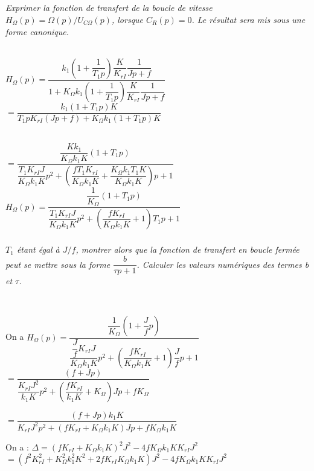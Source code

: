 \begin{multicols}{2}
 
 
 
 \fi
 

\subparagraph{}\textit{Exprimer la fonction de transfert de la boucle de vitesse
  \(H_{\Omega}\left( p \right) = \Omega(p)/U_{C\Omega}(p)\), lorsque
  \(C_{R}\left( p \right) = 0\). Le résultat sera mis sous une forme canonique.}

\ifprof
\begin{corrige}~\\

$H_{\Omega}(p)=\dfrac{k_{1}\left( 1 + \dfrac{1}{T_{1}p} \right)\dfrac{K}{K_{rI}}\dfrac{1}{Jp+f}}{1+ K_{\Omega}k_{1}\left( 1 +\dfrac{1}{T_{1}p} \right)\dfrac{K}{K_{rI}}\dfrac{1}{Jp+f}}$
$=\dfrac{k_{1}\left( 1 + T_{1}p \right)K}{T_{1}p K_{rI}\left(Jp+f\right) + K_{\Omega}k_{1}\left(1+ T_{1}p\right) K}$

~\\

$=\dfrac{\dfrac{Kk_{1}}{K_{\Omega}k_{1}K}\left( 1 + T_{1}p \right)}{\dfrac{T_{1} K_{rI}J}{K_{\Omega}k_{1}K}p^2+\left(\dfrac{fT_{1} K_{rI}}{K_{\Omega}k_{1}K}+\dfrac{K_{\Omega}k_{1}T_{1}K}{K_{\Omega}k_{1}K}\right)p + 1 }$
$H_{\Omega}(p)=\dfrac{\dfrac{1}{K_{\Omega}}\left( 1 + T_{1}p \right)}{\dfrac{T_{1} K_{rI}J}{K_{\Omega}k_{1}K}p^2+\left(\dfrac{f K_{rI}}{K_{\Omega}k_{1}K}+1\right)T_{1}p + 1 }$

\end{corrige}
\else
\fi

\subparagraph{}\textit{$T_1$ étant égal à $J/f$, montrer alors que
  la fonction de transfert en boucle fermée peut se mettre sous la forme
  \(\dfrac{b}{\tau p + 1}\). Calculer les valeurs numériques des termes
  \emph{b} et \emph{$\tau$}.}

\ifprof
\begin{corrige}~\\

\footnotesize

On a 
$H_{\Omega}(p)=\dfrac{\dfrac{1}{K_{\Omega}}\left( 1 + \dfrac{J}{f}p \right)}{\dfrac{\dfrac{J}{f} K_{rI}J}{K_{\Omega}k_{1}K}p^2+\left(\dfrac{f K_{rI}}{K_{\Omega}k_{1}K}+1\right)\dfrac{J}{f}p + 1 }$
$=\dfrac{\left( f + Jp \right)}{\dfrac{ K_{rI}J^2}{k_{1}K}p^2+\left(\dfrac{f K_{rI}}{k_{1}K}+K_{\Omega}\right)Jp + fK_{\Omega}}$

$=\dfrac{\left( f + Jp \right)k_{1}K}{ K_{rI}J^2p^2+\left(f K_{rI}+K_{\Omega}k_{1}K\right)Jp + fK_{\Omega}k_{1}K}$


On a :
$\Delta =\left(f K_{rI}+K_{\Omega}k_{1}K\right)^2J^2 -4 fK_{\Omega}k_{1}KK_{rI}J^2 $ 
$=\left(f^2 K_{rI}^2+K_{\Omega}^2k_{1}^2K^2+2f K_{rI}K_{\Omega}k_{1}K\right)J^2 -4 fK_{\Omega}k_{1}KK_{rI}J^2 $


\end{corrige}
\end{multicols}
